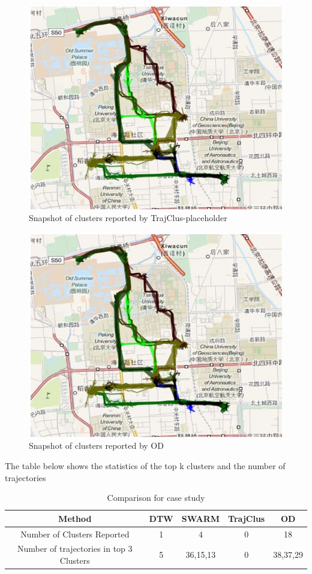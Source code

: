 \begin{figure}
\centering     
\includegraphics[scale=0.4]{figs/casestudy_our.jpg}
\caption{Snapshot of clusters reported by TrajClus-placeholder}
\label{fig:casestudy_trajclus}  
\end{figure} 
\begin{figure}
\centering     
\includegraphics[scale=0.4]{figs/casestudy_our.jpg}
\caption{Snapshot of clusters reported by OD}
\label{fig:casestudy_od}  
\end{figure} 


The table below shows the statistics of the top k clusters and the number of trajectories 

\begin{table}
	\centering
		\begin{tabular}{|c|c|c|c|c|} 
			\hline
			Method&DTW&SWARM&TrajClus&OD\\
			\hline
			Number of Clusters Reported&1&4&0&18\\
			Number of trajectories in top 3 Clusters & 5&36,15,13&0&38,37,29\\
			\hline
		\end{tabular}
	\caption{Comparison for case study}
	\label{tab:case_study}
\end{table}